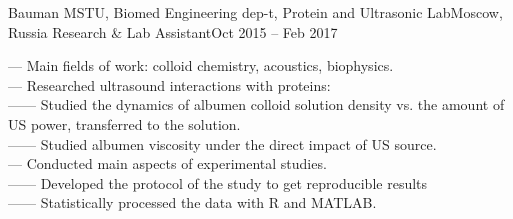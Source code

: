     \resumeSubheading
      {Bauman MSTU, Biomed Engineering dep-t, Protein and Ultrasonic Lab}{Moscow, Russia}
      {Research \& Lab Assistant}{Oct 2015 -- Feb 2017}
      \begin{itemize}[leftmargin=0in, label={}]
            \small{\item{
                {— Main fields of work: colloid chemistry, acoustics, biophysics.}\\
                {— Researched ultrasound interactions with proteins:}\\
                {—— Studied the dynamics of albumen colloid solution density vs. the amount of US power, transferred to the solution.}\\
                {—— Studied albumen viscosity under the direct  impact of US source.}\\
                {— Conducted main aspects of experimental studies.}\\
                {—— Developed the protocol of the study to get reproducible results}\\
                {—— Statistically processed the data with R and MATLAB.}\\
            }}
      \end{itemize}